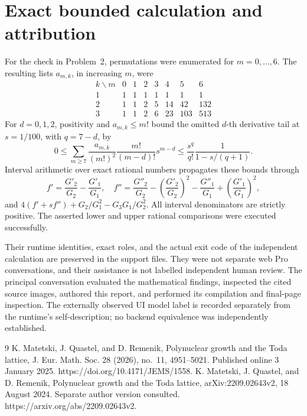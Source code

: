 \documentclass[10pt]{article}
\begin{document}
\section*{Exact bounded calculation and attribution}
For the check in Problem 2, permutations were enumerated for \(m=0,\ldots,6\). The resulting lists \(a_{m,k}\), in increasing \(m\), were \[\begin{array}{c|rrrrrrr}
k\backslash m&0&1&2&3&4&5&6\\ \hline
1&1&1&1&1&1&1&1\\
2&1&1&2&5&14&42&132\\
3&1&1&2&6&23&103&513
\end{array}\] For \(d=0,1,2\), positivity and \(a_{m,k}\leq m!\) bound the omitted \(d\)-th derivative tail at \(s=1/100\), with \(q=7-d\), by \[0\leq
\sum_{m\geq7}\frac{a_{m,k}}{(m!)^2}
 \frac{m!}{(m-d)!}s^{m-d}
\leq
\frac{s^q}{q!}\frac{1}{1-s/(q+1)}.\] Interval arithmetic over exact rational numbers propagates these bounds through \[f'=\frac{G'_2}{G_2}-\frac{G'_1}{G_1},\quad
f''=\frac{G''_2}{G_2}-\left(\frac{G'_2}{G_2}\right)^2
-\frac{G''_1}{G_1}+\left(\frac{G'_1}{G_1}\right)^2,\] and \(4(f'+sf'')+G_2/G_1^2-G_3G_1/G_2^2\). All interval denominators are strictly positive. The asserted lower and upper rational comparisons were executed successfully.\par
Their runtime identities, exact roles, and the actual exit code of the independent calculation are preserved in the support files. They were not separate web Pro conversations, and their assistance is not labelled independent human review. The principal conversation evaluated the mathematical findings, inspected the cited source images, authored this report, and performed its compilation and final-page inspection. The externally observed UI model label is recorded separately from the runtime’s self-description; no backend equivalence was independently established.\par
9 K. Matetski, J. Quastel, and D. Remenik, Polynuclear growth and the Toda lattice, J. Eur. Math. Soc. 28 (2026), no. 11, 4951–5021. Published online 3 January 2025. https://doi.org/10.4171/JEMS/1558. K. Matetski, J. Quastel, and D. Remenik, Polynuclear growth and the Toda lattice, arXiv:2209.02643v2, 18 August 2024. Separate author version consulted. https://arxiv.org/abs/2209.02643v2.\par
\end{document}
